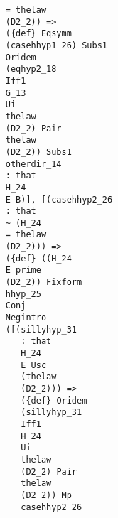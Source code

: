 \documentclass[12pt]{article}
\begin{document}
\begin{verbatim}
                                                 = thelaw 
                                                 (D2_2)) => 
                                                 ({def} Eqsymm 
                                                 (casehhyp1_26) Subs1 
                                                 Oridem 
                                                 (eqhyp2_18 
                                                 Iff1 
                                                 G_13 
                                                 Ui 
                                                 thelaw 
                                                 (D2_2) Pair 
                                                 thelaw 
                                                 (D2_2)) Subs1 
                                                 otherdir_14 
                                                 : that 
                                                 H_24 
                                                 E B)], [(casehhyp2_26 
                                                 : that 
                                                 ~ (H_24 
                                                 = thelaw 
                                                 (D2_2))) => 
                                                 ({def} ((H_24 
                                                 E prime 
                                                 (D2_2)) Fixform 
                                                 hhyp_25 
                                                 Conj 
                                                 Negintro 
                                                 ([(sillyhyp_31 
                                                    : that 
                                                    H_24 
                                                    E Usc 
                                                    (thelaw 
                                                    (D2_2))) => 
                                                    ({def} Oridem 
                                                    (sillyhyp_31 
                                                    Iff1 
                                                    H_24 
                                                    Ui 
                                                    thelaw 
                                                    (D2_2) Pair 
                                                    thelaw 
                                                    (D2_2)) Mp 
                                                    casehhyp2_26 

\end{verbatim}
\end{document}
